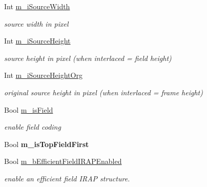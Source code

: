 \begin{DoxyCompactItemize}
Int \hyperlink{class_t_app_enc_cfg_a269c94d738aae7f91b2f37984359bdc3}{m\+\_\+i\+Source\+Width}
\begin{DoxyCompactList}\small\item\em source width in pixel \end{DoxyCompactList}\item 
\mbox{\label{class_t_app_enc_cfg_a16534813acf51e721984eb6eec352426}} 
Int \hyperlink{class_t_app_enc_cfg_a16534813acf51e721984eb6eec352426}{m\+\_\+i\+Source\+Height}
\begin{DoxyCompactList}\small\item\em source height in pixel (when interlaced = field height) \end{DoxyCompactList}\item 
\mbox{\label{class_t_app_enc_cfg_abb337431bd908fa26b3e9d5fb90eaedd}} 
Int \hyperlink{class_t_app_enc_cfg_abb337431bd908fa26b3e9d5fb90eaedd}{m\+\_\+i\+Source\+Height\+Org}
\begin{DoxyCompactList}\small\item\em original source height in pixel (when interlaced = frame height) \end{DoxyCompactList}\item 
\mbox{\label{class_t_app_enc_cfg_a1463e2040b1a6193859147e3a2b9c2a9}} 
Bool \hyperlink{class_t_app_enc_cfg_a1463e2040b1a6193859147e3a2b9c2a9}{m\+\_\+is\+Field}
\begin{DoxyCompactList}\small\item\em enable field coding \end{DoxyCompactList}\item 
\mbox{\label{class_t_app_enc_cfg_a3ca4952888f58297b1b93604db1b5d96}} 
Bool {\bfseries m\+\_\+is\+Top\+Field\+First}
\item 
\mbox{\label{class_t_app_enc_cfg_a362a4adad1e1d6874f2480b0a2819fd0}} 
Bool \hyperlink{class_t_app_enc_cfg_a362a4adad1e1d6874f2480b0a2819fd0}{m\+\_\+b\+Efficient\+Field\+I\+R\+A\+P\+Enabled}
\begin{DoxyCompactList}\small\item\em enable an efficient field I\+R\+AP structure. \end{DoxyCompactList}\item 

\end{DoxyCompactItemize}
